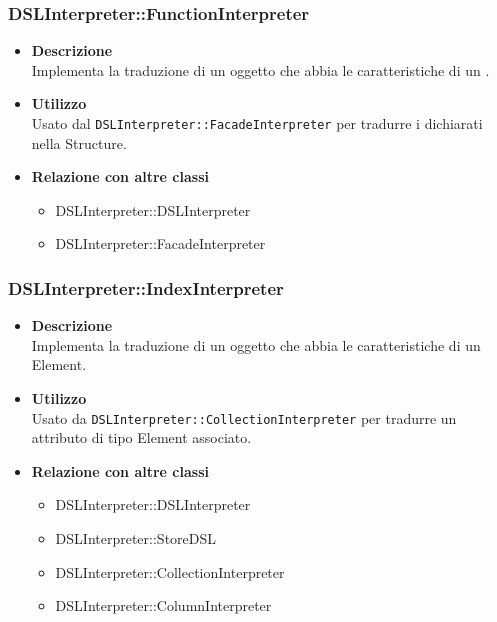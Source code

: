 \subsubsection{DSLInterpreter::FunctionInterpreter}
\begin{itemize}
\item \textbf{Descrizione} \hfill \\
  Implementa la traduzione di un oggetto che abbia le caratteristiche di un .
\item \textbf{Utilizzo} \hfill \\
  Usato dal \texttt{DSLInterpreter::FacadeInterpreter} per tradurre i  dichiarati nella  Structure.
\item \textbf{Relazione con altre classi}
  \begin{itemize}
  \item DSLInterpreter::DSLInterpreter
  \item DSLInterpreter::FacadeInterpreter
  \end{itemize}
\end{itemize}

\subsubsection{DSLInterpreter::IndexInterpreter}
\begin{itemize}
\item \textbf{Descrizione} \hfill \\
  Implementa la traduzione di un oggetto che abbia le caratteristiche di un  Element.
\item \textbf{Utilizzo} \hfill \\
  Usato da \texttt{DSLInterpreter::CollectionInterpreter} per tradurre un attributo di tipo  Element associato.
\item \textbf{Relazione con altre classi}
  \begin{itemize}
  \item DSLInterpreter::DSLInterpreter
  \item DSLInterpreter::StoreDSL
  \item DSLInterpreter::CollectionInterpreter
  \item DSLInterpreter::ColumnInterpreter
  \end{itemize}
\end{itemize}

